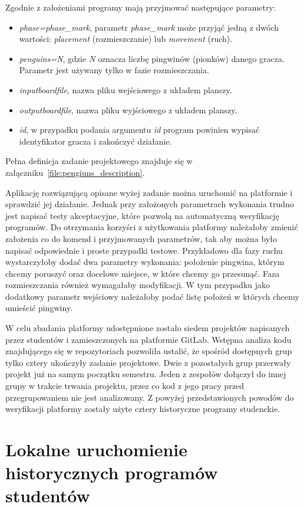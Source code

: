 Zgodnie z założeniami programy mają przyjmować następujące parametry:
\begin{itemize}
    \item \textit{phase=phase\_mark}, parametr \textit{phase\_mark} może przyjąć jedną z dwóch wartości: \textit{placement} (rozmieszczanie) lub \textit{movement} (ruch).
    \item \textit{penguins=N}, gdzie \textit{N} oznacza liczbę pingwinów (pionków) danego gracza.
    Parametr jest używany tylko w fazie rozmieszczania.
    \item \textit{inputboardfile}, nazwa pliku wejściowego z układem planszy.
    \item \textit{outputboardfile}, nazwa pliku wyjściowego z układem planszy.
    \item \textit{id}, w przypadku podania argumentu \textit{id} program powinien wypisać identyfikator gracza i zakończyć działanie.
\end{itemize}
Pełna definicja zadanie projektowego znajduje się w załączniku~\ref{file:pengiuns_description}.

Aplikację rozwiązującą opisane wyżej zadanie można uruchomić na platformie i sprawdzić jej działanie.
Jednak przy założonych parametrach wykonania trudno jest napisać testy akceptacyjne, które pozwolą na automatyczną weryfikację programów.
Do otrzymania korzyści z użytkowania platformy należałoby zmienić założenia co do komend i przyjmowanych parametrów, tak aby można było napisać odpowiednie i proste przypadki testowe.
Przykładowo dla fazy ruchu wystarczyłoby dodać dwa parametry wykonania: położenie pingwina, którym chcemy poruszyć oraz docelowe miejsce, w które chcemy go przesunąć.
Faza rozmieszczania również wymagałaby modyfikacji.
W tym przypadku jako dodatkowy parametr wejściowy należałoby podać listę położeń w których chcemy umieścić pingwiny.

W celu zbadania platformy udostępnione zostało siedem projektów napisanych przez studentów i zamieszczonych na platformie GitLab.
Wstępna analiza kodu znajdującego się w repozytoriach pozwoliła ustalić, że spośród dostępnych grup tylko cztery ukończyły zadanie projektowe.
Dwie z pozostałych grup przerwały projekt już na samym początku semestru.
Jeden z zespołów dołączył do innej grupy w trakcie trwania projektu, przez co kod z jego pracy przed przegrupowaniem nie jest analizowany.
Z powyżej przedstawionych powodów do weryfikacji platformy zostały użyte cztery historyczne programy studenckie.

\section{Lokalne uruchomienie historycznych programów studentów}

